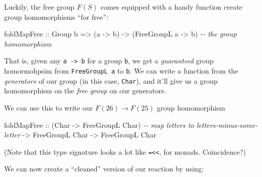 \documentclass[]{article}
\newenvironment{Shaded}{}{}
\newcommand{\CommentTok}[1]{\textcolor[rgb]{0.38,0.63,0.69}{\textit{#1}}}
\newcommand{\DataTypeTok}[1]{\textcolor[rgb]{0.56,0.13,0.00}{#1}}
\newcommand{\FunctionTok}[1]{\textcolor[rgb]{0.02,0.16,0.49}{#1}}
\newcommand{\KeywordTok}[1]{\textcolor[rgb]{0.00,0.44,0.13}{\textbf{#1}}}
\newcommand{\NormalTok}[1]{#1}
\newcommand{\OperatorTok}[1]{\textcolor[rgb]{0.40,0.40,0.40}{#1}}
\newcommand{\OtherTok}[1]{\textcolor[rgb]{0.00,0.44,0.13}{#1}}
\begin{document}
Luckily, the free group \(F(S)\) comes equipped with a handy function create
group homomorphisms ``for free'':

\begin{Shaded}
\begin{Highlighting}[]
\NormalTok{foldMapFree}
\OtherTok{    ::} \DataTypeTok{Group}\NormalTok{ b}
    \OtherTok{=>}\NormalTok{ (a }\OtherTok{{-}>}\NormalTok{ b)}
    \OtherTok{{-}>}\NormalTok{ (}\DataTypeTok{FreeGroupL}\NormalTok{ a }\OtherTok{{-}>}\NormalTok{ b)     }\CommentTok{{-}{-} the group homomorphism}
\end{Highlighting}
\end{Shaded}

That is, given any \texttt{a\ -\textgreater{}\ b} for a group \texttt{b}, we get
a \emph{guaranteed} group homormohpsim from \texttt{FreeGroupL\ a} to
\texttt{b}. We can write a function from the \emph{generators} of our group (in
this case, \texttt{Char}), and it'll give us a group homomorphism on the
\emph{free group} on our generators.

We can use this to write our \(F(26) \rightarrow F(25)\) group homomorphism

\begin{Shaded}
\begin{Highlighting}[]
\NormalTok{foldMapFree}
\OtherTok{    ::}\NormalTok{ (}\DataTypeTok{Char} \OtherTok{{-}>} \DataTypeTok{FreeGroupL} \DataTypeTok{Char}\NormalTok{)  }\CommentTok{{-}{-} map letters to letters{-}minus{-}some{-}letter}
    \OtherTok{{-}>} \DataTypeTok{FreeGroupL} \DataTypeTok{Char}
    \OtherTok{{-}>} \DataTypeTok{FreeGroupL} \DataTypeTok{Char}
\end{Highlighting}
\end{Shaded}

(Note that this type signature looks a lot like
\texttt{=\textless{}\textless{}}, for monads. Coincidence?)

We can now create a ``cleaned'' version of our reaction by using:

\begin{Shaded}
\end{Shaded}
\end{document}
